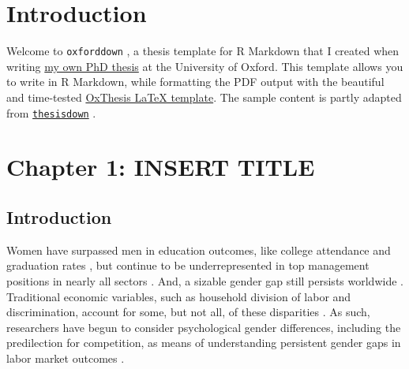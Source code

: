 \documentclass[a4paper, nobind]{templates/ociamthesis}
\begin{document}
\begin{romanpages}
\listoffigures
	\mtcaddchapter

\listoftables
  \mtcaddchapter

\end{romanpages}

\flushbottom

\hypertarget{introduction}{%
\chapter*{Introduction}\label{introduction}}

\adjustmtc
{}

Welcome to \texttt{oxforddown} \autocite{lyngsOxforddown2019}, a thesis template for R Markdown that I created when writing \href{https://ulyngs.github.io/phd-thesis/}{my own PhD thesis} at the University of Oxford.
This template allows you to write in R Markdown, while formatting the PDF output with the beautiful and time-tested \href{https://github.com/mcmanigle/OxThesis}{OxThesis LaTeX template}.
The sample content is partly adapted from \href{https://github.com/ismayc/thesisdown}{\texttt{thesisdown}} .

\hypertarget{chapter-1-insert-title}{%
\chapter{Chapter 1: INSERT TITLE}\label{chapter-1-insert-title}}

\hypertarget{introduction-1}{%
\section{Introduction}\label{introduction-1}}

Women have surpassed men in education outcomes, like college attendance and graduation rates \autocite{Blau2017,Goldin2006,Stoet2014}, but continue to be underrepresented in top management positions in nearly all sectors \autocite{Bertrand2001}. And, a sizable gender gap still persists worldwide \autocite{Blau2017}. Traditional economic variables, such as household division of labor and discrimination, account for some, but not all, of these disparities \autocite{Blau2017}. As such, researchers have begun to consider psychological gender differences, including the predilection for competition, as means of understanding persistent gender gaps in labor market outcomes \autocite[for review, see][]{Niederle2011}.
\end{document}
